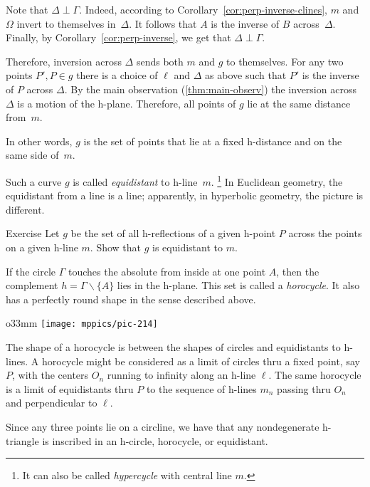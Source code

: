Note that $\Delta\perp \Gamma$.
Indeed,
according to Corollary~\ref{cor:perp-inverse-clines}, $m$ and $\Omega$ invert to themselves in~$\Delta$.
It follows that $A$ is the inverse of $B$ across~$\Delta$.
Finally, by Corollary~\ref{cor:perp-inverse}, we get that $\Delta\perp \Gamma$.

Therefore, inversion across $\Delta$ sends both $m$ and $g$ to themselves.
For any two points $P',P\in g$ there is a choice of $\ell$ and $\Delta$ as above such that
$P'$ is the inverse of $P$ across $\Delta$.
By the main observation (\ref{thm:main-observ}) the inversion across $\Delta$ is a motion of the h-plane. Therefore, all points of $g$ lie at the same distance from~$m$.

In other words, $g$ is the set of points that lie at a fixed h-distance and on the same side of~$m$.

Such a curve $g$ is called 
\emph{equidistant} to h-line~$m$.%
\footnote{It can also be called \emph{hypercycle} with central line $m$.}
In Euclidean geometry, the equidistant from a line is a line;
apparently, in hyperbolic geometry, the picture is different.

\begin{thm}{Exercise}\label{ex:equidistant-reflection}
Let $g$ be the set of all h-reflections of a given h-point $P$ across the points on a given h-line $m$.
Show that $g$ is equidistant to $m$.
\end{thm}


If the circle $\Gamma$ touches the absolute from inside at one point $A$, then the complement $h=\Gamma\backslash\{A\}$ lies in the h-plane.
This set is called a \emph{horocycle}.
It also has a perfectly round shape in the sense described above.

\begin{wrapfigure}{o}{33mm}
\vskip-0mm
\centering
\texttt{[image: mppics/pic-214]}
\end{wrapfigure}

The shape of a horocycle is between the shapes of circles and equidistants to h-lines.
A horocycle might be considered as a limit of circles 
thru a fixed point, say $P$,
with the centers $O_n$ running to infinity along an h-line $\ell$.
The same horocycle is a limit of equidistants thru $P$ to the sequence of h-lines $m_n$ passing thru $O_n$ and perpendicular to $\ell$.

Since any three points lie on a circline, we have that any nondegenerate h-triangle is inscribed in an h-circle, horocycle, or equidistant.

